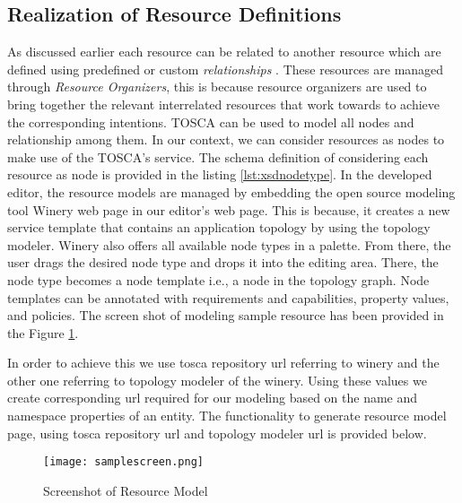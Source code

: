 \subsection{Realization of Resource Definitions}
As discussed earlier each resource can be related to another resource which are defined using predefined or custom \textit{relationships} \cite{Sungur2014a}. These resources are managed through \textit{Resource Organizers}, this is because resource organizers are used to bring together the relevant interrelated resources that work towards to achieve the corresponding intentions. TOSCA \cite{Binz2014} can be used to model all nodes and relationship among them. In our context, we can consider resources as nodes to make use of the TOSCA's service. The schema definition of considering each resource as node is provided in the listing \ref{lst:xsdnodetype}. In the developed editor, the resource models are managed by embedding  the open source modeling tool Winery web page \cite{Kopp2013} in our editor's web page. This is because, it creates a new service template that contains an application topology by using the topology modeler. Winery also offers all available node types in a palette. From there, the user drags the desired node type and drops it into the editing area. There, the node type
becomes a node template i.e., a node in the topology graph. Node templates can be annotated with requirements and capabilities, property values, and policies. The screen shot of modeling sample resource has been provided in the Figure \ref{fig:realizationofresourcemodel}. 

In order to achieve this we use tosca repository url referring to winery and the other one referring to topology modeler of the winery. Using these values we create corresponding url required for our modeling based on the name and namespace properties of an entity. The functionality to generate resource model page, using tosca repository url and topology modeler url is provided below.

			
			
\begin{figure}
	\centering
	\texttt{[image: samplescreen.png]}
	\caption{Screenshot of Resource Model}
	\label{fig:realizationofresourcemodel}
\end{figure}


